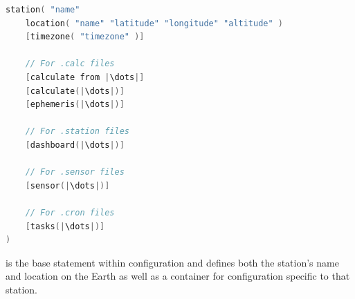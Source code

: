 
\begin{lstlisting}[language=Go,style=kaolstplain,escapechar=|]
station( "name"
    location( "name" "latitude" "longitude" "altitude" )
    [timezone( "timezone" )]

    // For .calc files
    [calculate from |\dots|]
    [calculate(|\dots|)]
    [ephemeris(|\dots|)]

    // For .station files
    [dashboard(|\dots|)]

    // For .sensor files
    [sensor(|\dots|)]

    // For .cron files
    [tasks(|\dots|)]
)
\end{lstlisting}

 is the base statement within configuration and defines both the station's name and location on the
Earth as well as a container for configuration specific to that station.